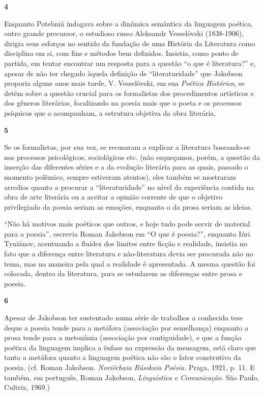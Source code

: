 \textbf{4}

Enquanto Potebniá indagava sobre a dinâmica semântica da linguagem
poética, outro grande precursor, o estudioso russo Aleksandr Vesselóvski
(1838-1906), dirigia seus esforços no sentido da fundação de uma
História da Literatura como disciplina em si, com fins e métodos bem
definidos. Insistia, como ponto de partida, em tentar encontrar um
resposta para a questão ``o que é literatura?'' e, apesar de não ter
chegado àquela definição de ``literaturidade'' que Jakobson proporia
alguns anos mais tarde, V. Vesselóvski, em sua \emph{Poética Histórica},
se detém sobre a questão crucial para os formalistas dos procedimentos
artísticos e dos gêneros literários, focalizando na poesia mais que o
poeta e os processos psíquicos que o acompanham, a estrutura objetiva da
obra literária,

\textbf{5}

Se os formalistas, por sua vez, se recusaram a explicar a literatura
baseando-se nos processos psicológicos, sociológicos etc. (não
esqueçamos, porém, a questão da inserção das diferentes séries e a da
evolução literária para as quais, passado o momento polêmico, sempre
estiveram atentos), eles também se mostraram arredios quanto a procurar
a ``literaturidade'' no nível da experiência contida na obra de arte
literária ou a aceitar a opinião corrente de que o objetivo privilegiado
da poesia seriam as emoções, enquanto o da prosa seriam as ideias.

``Não há motivos mais poéticos que outros, e hoje tudo pode servir de
material para a poesia'', escrevia Roman Jakobson em ``O que é
poesia?'', enquanto Iúri Tyniánov, acentuando a fluidez dos limites
entre ficção e realidade, insistia no fato que a diferença entre
literatura e não-literatura devia ser procurada não no tema, mas na
maneira pela qual a realidade é apresentada. A mesma questão foi
colocada, dentro da literatura, para se estudarem as diferenças entre
prosa e poesia.

\textbf{6}

Apesar de Jakobson ter sustentado numa série de trabalhos a conhecida
tese deque a poesia tende para a metáfora (associação por semelhança)
enquanto a prosa tende para a metonímia (associação por contiguidade), e
que a função poética da linguagem implica a ênfase na expressão da
mensagem, está claro que tanto a metáfora quanto a linguagem poética não
são o fator construtivo da poesia. (cf. Roman Jakobson. \emph{Noviéchaia
Rússkaia Poésia.} Praga, 1921, p. 11. E também, em português, Roman
Jakobson, \emph{Linguística e Comunicação}. São Paulo, Cultrix, 1969.)


